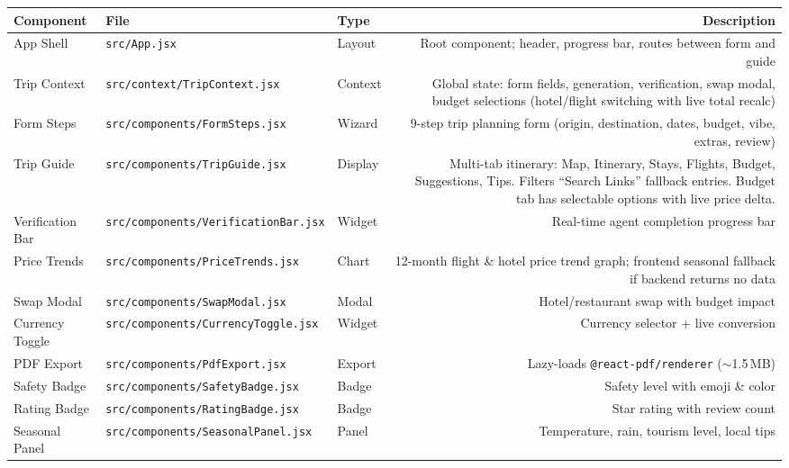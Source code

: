 \documentclass[11pt,a4paper]{article}
\begin{document}
{\small
\begin{tabularx}{\textwidth}{@{}L{2.6cm}L{3.8cm}L{1.4cm}R@{}}
\toprule
\textbf{Component} & \textbf{File} & \textbf{Type} & \textbf{Description} \\
\midrule
App Shell        & \texttt{src/App.jsx}            & Layout   & Root component; header, progress bar, routes between form and guide \\[4pt]
Trip Context     & \texttt{src/context/\allowbreak TripContext.jsx} & Context  & Global state: form fields, generation, verification, swap modal, budget selections (hotel/flight switching with live total recalc) \\[4pt]
Form Steps       & \texttt{src/components/\allowbreak FormSteps.jsx} & Wizard   & 9-step trip planning form (origin, destination, dates, budget, vibe, extras, review) \\[4pt]
Trip Guide       & \texttt{src/components/\allowbreak TripGuide.jsx} & Display  & Multi-tab itinerary: Map, Itinerary, Stays, Flights, Budget, Suggestions, Tips. Filters ``Search Links'' fallback entries. Budget tab has selectable options with live price delta. \\[4pt]
Verification Bar & \texttt{src/components/\allowbreak VerificationBar.jsx} & Widget & Real-time agent completion progress bar \\[4pt]
Price Trends     & \texttt{src/components/\allowbreak PriceTrends.jsx} & Chart    & 12-month flight \& hotel price trend graph; frontend seasonal fallback if backend returns no data \\[4pt]
Swap Modal       & \texttt{src/components/\allowbreak SwapModal.jsx} & Modal    & Hotel/restaurant swap with budget impact \\[4pt]
Currency Toggle  & \texttt{src/components/\allowbreak CurrencyToggle.jsx} & Widget & Currency selector + live conversion \\[4pt]
PDF Export       & \texttt{src/components/\allowbreak PdfExport.jsx} & Export   & Lazy-loads \texttt{@react-pdf/\allowbreak renderer} ($\sim$1.5\,MB) \\[4pt]
Safety Badge     & \texttt{src/components/\allowbreak SafetyBadge.jsx} & Badge    & Safety level with emoji \& color \\[4pt]
Rating Badge     & \texttt{src/components/\allowbreak RatingBadge.jsx} & Badge    & Star rating with review count \\[4pt]
Seasonal Panel   & \texttt{src/components/\allowbreak SeasonalPanel.jsx} & Panel    & Temperature, rain, tourism level, local tips \\[4pt]

\end{tabularx}}
\end{document}
